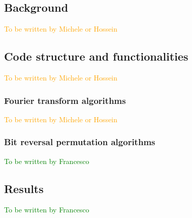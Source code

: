 \subsection{Background}
\textcolor{orange}{To be written by Michele or Hossein}

\subsection{Code structure and functionalities}
\textcolor{orange}{To be written by Michele or Hossein}

\subsubsection{Fourier transform algorithms}
\textcolor{orange}{To be written by Michele or Hossein}

\subsubsection{Bit reversal permutation algorithms}
\textcolor{green}{To be written by Francesco}

\subsection{Results}
\textcolor{green}{To be written by Francesco}